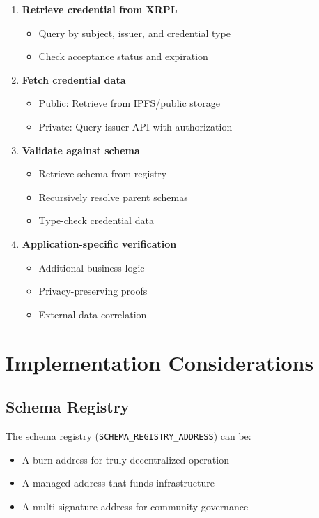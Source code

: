\documentclass[11pt,a4paper]{article}
\begin{document}
\begin{enumerate}
    \item \textbf{Retrieve credential from XRPL}
    \begin{itemize}
        \item Query by subject, issuer, and credential type
        \item Check acceptance status and expiration
    \end{itemize}
    
    \item \textbf{Fetch credential data}
    \begin{itemize}
        \item Public: Retrieve from IPFS/public storage
        \item Private: Query issuer API with authorization
    \end{itemize}
    
    \item \textbf{Validate against schema}
    \begin{itemize}
        \item Retrieve schema from registry
        \item Recursively resolve parent schemas
        \item Type-check credential data
    \end{itemize}
    
    \item \textbf{Application-specific verification}
    \begin{itemize}
        \item Additional business logic
        \item Privacy-preserving proofs
        \item External data correlation
    \end{itemize}
\end{enumerate}

\section{Implementation Considerations}

\subsection{Schema Registry}

The schema registry (\texttt{SCHEMA\_REGISTRY\_ADDRESS}) can be:
\begin{itemize}
    \item A burn address for truly decentralized operation
    \item A managed address that funds infrastructure
    \item A multi-signature address for community governance
\end{itemize}
\end{document}
